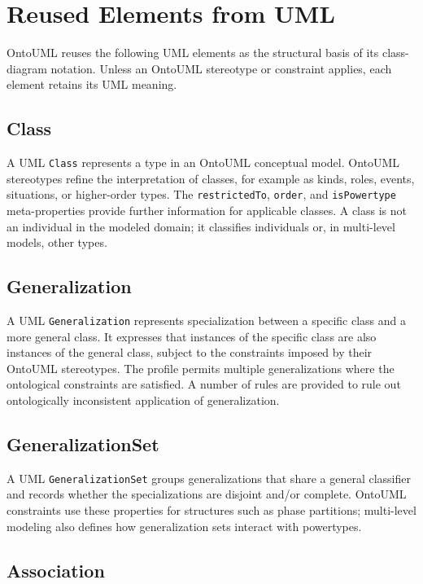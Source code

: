 \section{Reused Elements from UML}
\label{sec:profile-reused-uml-elements}

OntoUML reuses the following UML elements as the structural basis of its class-diagram notation. Unless an OntoUML stereotype or constraint applies, each element retains its UML meaning.

\subsection{Class}

A UML \texttt{Class} represents a type in an OntoUML conceptual model. OntoUML stereotypes refine the interpretation of classes, for example as kinds, roles, events, situations, or higher-order types. The \texttt{restrictedTo}, \texttt{order}, and \texttt{isPowertype} meta-properties provide further information for applicable classes. A class is not an individual in the modeled domain; it classifies individuals or, in multi-level models, other types.

\subsection{Generalization}

A UML \texttt{Generalization} represents specialization between a specific class and a more general class. It expresses that instances of the specific class are also instances of the general class, subject to the constraints imposed by their OntoUML stereotypes. The profile permits multiple generalizations where the ontological constraints are satisfied. A number of rules are provided to rule out ontologically inconsistent application of generalization.

\subsection{GeneralizationSet}

A UML \texttt{GeneralizationSet} groups generalizations that share a general classifier and records whether the specializations are disjoint and/or complete. OntoUML constraints use these properties for structures such as phase partitions; multi-level modeling also defines how generalization sets interact with powertypes. 

\subsection{Association}

